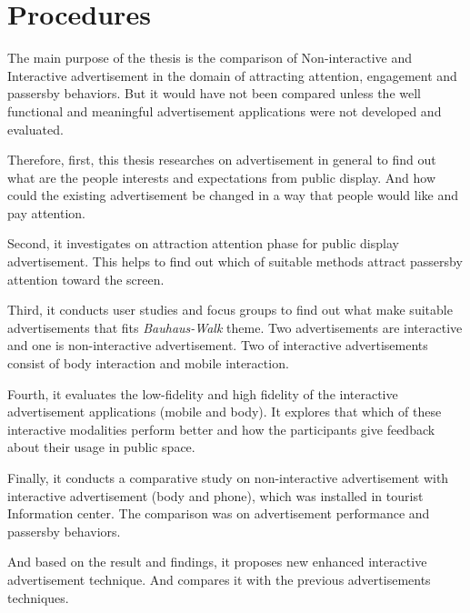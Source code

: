 \section{Procedures}

The main purpose of the thesis is the comparison of Non-interactive and Interactive advertisement in the domain of attracting attention, engagement and passersby behaviors. But it would have not been compared unless the well functional and meaningful advertisement applications were not developed and evaluated. 

Therefore, first, this thesis researches on advertisement in general to find out what are the people interests and expectations from public display. And how could the existing advertisement be changed in a way that people would like and pay attention.

Second, it investigates on attraction attention phase for public display advertisement. This helps to find out which of suitable methods attract passersby attention toward the screen.

Third, it conducts user studies and focus groups to find out what make suitable advertisements that fits \emph{Bauhaus-Walk} theme. Two advertisements are interactive and one is non-interactive advertisement. Two of interactive advertisements consist of body interaction and mobile interaction.

Fourth, it evaluates the low-fidelity and high fidelity of the interactive advertisement applications (mobile and body). It explores that which of these interactive modalities perform better and how the participants give feedback about their usage in public space.

Finally, it conducts a comparative study on non-interactive advertisement with interactive advertisement (body and phone), which was installed in tourist Information center.  The comparison was on advertisement performance and passersby behaviors.

And based on the result and findings, it proposes new enhanced interactive advertisement technique. And compares it with the previous advertisements techniques.




